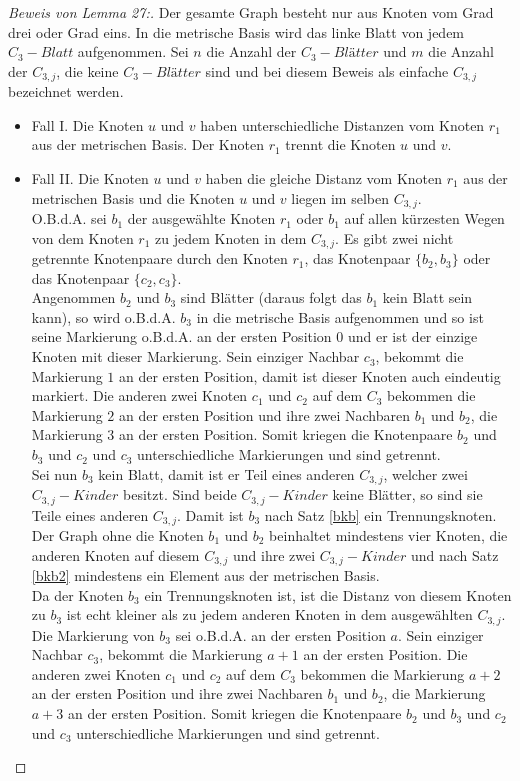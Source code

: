 \begin{proof}[Beweis von Lemma 27:]
Der gesamte Graph besteht nur aus Knoten vom Grad drei oder Grad eins. In die metrische Basis wird das linke Blatt von jedem $C_{3}-Blatt$ aufgenommen. Sei $n$ die Anzahl der $C_{3}-Blätter$ und $m$ die Anzahl der $C_{3,j}$, die keine $C_{3}-Blätter$ sind und bei diesem Beweis als einfache $C_{3,j}$ bezeichnet werden.
\begin{itemize}
\item Fall I. Die Knoten $u$ und $v$ haben unterschiedliche Distanzen vom Knoten $r_1$ aus der metrischen Basis. Der Knoten $r_1$ trennt die Knoten $u$ und $v$.
\item Fall II. Die Knoten $u$ und $v$ haben die gleiche Distanz vom Knoten $r_1$ aus der metrischen Basis und die Knoten $u$ und $v$ liegen im selben $C_{3,j}$.\\
O.B.d.A. sei $b_1$ der ausgewählte Knoten $r_1$ oder $b_1$ auf allen kürzesten Wegen von dem Knoten $r_1$ zu jedem Knoten in dem $C_{3,j}$. Es gibt zwei nicht getrennte Knotenpaare durch den Knoten $r_1$, das Knotenpaar $\{b_2,b_3\}$ oder das Knotenpaar $\{c_2,c_3\}$.\\
Angenommen $b_2$ und $b_3$ sind Blätter (daraus folgt das $b_1$ kein Blatt sein kann), so wird o.B.d.A. $b_3$ in die metrische Basis aufgenommen und so ist seine Markierung o.B.d.A. an der ersten Position $0$ und er ist der einzige Knoten mit dieser Markierung. Sein einziger Nachbar $c_3$, bekommt die Markierung $1$ an der ersten Position, damit ist dieser Knoten auch eindeutig markiert. Die anderen zwei Knoten $c_1$ und $c_2$ auf dem $C_3$ bekommen die Markierung $2$ an der ersten Position und ihre zwei Nachbaren $b_1$ und $b_2$, die Markierung $3$ an der ersten Position. Somit kriegen die Knotenpaare $b_2$ und $b_3$ und $c_2$ und $c_3$ unterschiedliche Markierungen und sind getrennt.\\ 	 
Sei nun $b_3$ kein Blatt, damit ist er Teil eines anderen $C_{3,j}$, welcher zwei $C_{3,j}-Kinder$ besitzt. Sind beide $C_{3,j}-Kinder$ keine Blätter, so sind sie Teile eines anderen $C_{3,j}$. Damit ist $b_3$ nach Satz \ref{bkb} ein Trennungsknoten. Der Graph ohne die Knoten $b_1$ und $b_2$ beinhaltet mindestens vier Knoten, die anderen Knoten auf diesem $C_{3,j}$ und ihre zwei $C_{3,j}-Kinder$ und nach Satz \ref{bkb2} mindestens ein Element aus der metrischen Basis.\\
Da der Knoten $b_3$ ein Trennungsknoten ist, ist die Distanz von diesem Knoten zu $b_3$ ist echt kleiner als zu jedem anderen Knoten in dem ausgewählten $C_{3,j}$. Die Markierung von $b_3$ sei o.B.d.A. an der ersten Position $a$. Sein einziger Nachbar $c_3$, bekommt die Markierung $a+1$ an der ersten Position. Die anderen zwei Knoten $c_1$ und $c_2$ auf dem $C_3$ bekommen die Markierung $a+2$ an der ersten Position und ihre zwei Nachbaren $b_1$ und $b_2$, die Markierung $a+3$ an der ersten Position. Somit kriegen die Knotenpaare $b_2$ und $b_3$ und $c_2$ und $c_3$ unterschiedliche Markierungen und sind getrennt.

\end{itemize}
\end{proof}
